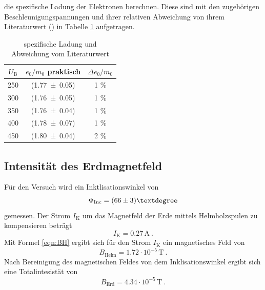 die spezifische Ladung der Elektronen berechnen. Diese sind mit den zugehörigen Beschleunigungspannungen und ihrer relativen Abweichung von ihrem Literaturwert (\cite{spez}) in Tabelle \ref{tab:e0m0} aufgetragen.
\begin{table}
  \centering
  \begin{tabular}{c| c c}
    \toprule
    $U_\text{B}$  & $e_0/m_0$ praktisch & $\Delta e_0/m_0$ \\
    \midrule
    	250	& (\num{1.77 +- 0.05}) & 1 \% \\
	300	& (\num{1.76 +- 0.05}) & 1 \% \\
	350	& (\num{1.76 +- 0.04}) & 1 \% \\
	400	& (\num{1.78 +- 0.07}) & 1 \% \\
	450	& (\num{1.80 +- 0.04}) & 2 \% \\
    \bottomrule
  \end{tabular}
  \caption{spezifische Ladung und Abweichung vom Literaturwert}
  \label{tab:e0m0}
\end{table}
\subsection{Intensität des Erdmagnetfeld}
Für den Versuch wird ein Inktlisationswinkel von
\begin{equation}
  \Phi_\text{Inc} = (\num{66 +-3})°
  \label{eqn:Inc}
\end{equation}
gemessen. Der Strom $I_\text{K}$ um das Magnetfeld der Erde mittels Helmholzspulen zu kompensieren beträgt
\begin{equation}
  I_\text{K} = 0.27 \, \text{A} \ .
  \label{IK}
\end{equation}
Mit Formel \eqref{eqn:BH} ergibt sich für den Strom $I_\text{K}$ ein magnetisches Feld von
\begin{equation}
  B_\text{Helm} = 1.72 \cdot 10^{-5} \, \text{T} \ .
  \label{eqn:Binc}
\end{equation}
Nach Bereinigung des magnetischen Feldes von dem Inklisationswinkel ergibt sich eine Totalintesistät von
\begin{equation}
  B_\text{Erd} = 4.34 \cdot 10^{-5} \, \text{T} \ .
  \label{eqn:Berd}
\end{equation}
